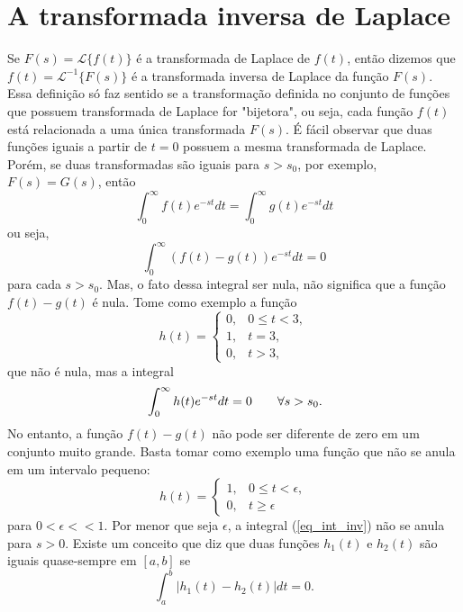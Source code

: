 \section{A transformada inversa de Laplace}
Se $F(s)=\mathcal{L}\{ f(t)\}$ é a transformada de Laplace de $f(t)$, então dizemos que $f(t)=\mathcal{L}^{-1}\{ F(s)\}$ é a transformada inversa de Laplace da função $F(s)$. Essa definição só faz sentido se a transformação definida no conjunto de funções que possuem transformada de Laplace for "bijetora", ou seja, cada função $f(t)$ está relacionada a uma única transformada $F(s)$. É fácil observar que duas funções iguais a partir de $t=0$ possuem a mesma transformada de Laplace. Porém, se duas transformadas são iguais para $s>s_0$, por exemplo, $F(s)=G(s)$, então
\begin{equation}
 \int_0^\infty f(t)e^{-st}dt=\int_0^\infty g(t)e^{-st}dt
\end{equation}
ou seja,
\begin{equation}
\int_0^\infty (f(t)-g(t))e^{-st}dt=0
\end{equation}
para cada $s>s_0$. Mas, o fato dessa integral ser nula, não significa que a função $f(t)-g(t)$ é nula. Tome como exemplo a função
\begin{equation}
h(t)=\left\{\begin{array}{ll} 0,& 0\leq t< 3,\\1,& t= 3,\\0,& t> 3,  \end{array}\right.
\end{equation}
que não é nula, mas a integral 
\begin{equation}{\label{eq_int_inv}}
\int_0^\infty h(t)e^{-st}dt=0\qquad \forall s>s_0.
\end{equation}
No entanto, a função $f(t)-g(t)$ não pode ser diferente de zero em um conjunto muito grande. Basta tomar como exemplo uma função que não se anula em um intervalo pequeno:
\begin{equation}
h(t)=\left\{\begin{array}{ll} 1,& 0\leq t< \epsilon,\\0,& t\geq \epsilon  \end{array}\right.
\end{equation}
para $0<\epsilon<<1$. Por menor que seja $\epsilon$, a integral (\ref{eq_int_inv}) não se anula para $s>0$. Existe um conceito que diz que duas funções $h_1(t)$ e $h_2(t)$ são iguais quase-sempre em $[a,b]$ se 
\begin{equation}
\int_a^b |h_1(t)-h_2(t)|dt=0.
\end{equation}
